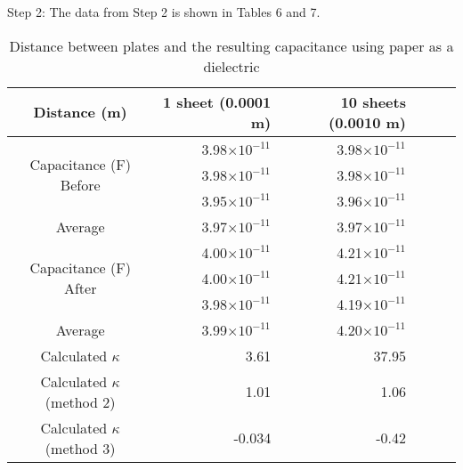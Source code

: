 \documentclass [12pt, letterpaper, twoside] {article}
\begin{document}
\noindent
Step 2: The data from Step 2 is shown in Tables 6 and 7.
\begin{table}[h!]
  \centering
  \begin{tabular}{| c | r | r | r | r | r |}
    \hline\hline
    Distance (m) & 1 sheet (0.0001 m) & 10 sheets (0.0010 m) \\
    \hline
    \multirow {3}{*}{Capacitance (F) Before} & 3.98\(\times10^{-11}\) & 3.98\(\times10^{-11}\) \\
    & 3.98\(\times10^{-11}\) & 3.98\(\times10^{-11}\) \\
    & 3.95\(\times10^{-11}\) & 3.96\(\times10^{-11}\) \\
    \hline
    Average & 3.97\(\times10^{-11}\) & 3.97\(\times10^{-11}\) \\
    \hline
    \multirow {3}{*}{Capacitance (F) After} & 4.00\(\times10^{-11}\) & 4.21\(\times10^{-11}\) \\
    & 4.00\(\times10^{-11}\) & 4.21\(\times10^{-11}\) \\
    & 3.98\(\times10^{-11}\) & 4.19\(\times10^{-11}\) \\
    \hline
    Average & 3.99\(\times10^{-11}\) & 4.20\(\times10^{-11}\) \\ %
    \hline
    Calculated \(\kappa\) & 3.61 & 37.95 \\ %
    \hline
    Calculated \(\kappa\) (method 2) & 1.01 & 1.06 \\ %
    \hline
    Calculated \(\kappa\) (method 3) & -0.034 & -0.42 \\ %
    \hline\hline
  \end{tabular}
  \caption{Distance between plates and the resulting capacitance using paper as a dielectric}
\end{table}
\end{document}
